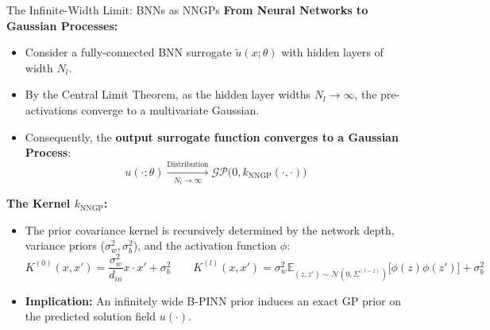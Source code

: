 \documentclass[10pt, aspectratio=169]{beamer}
\begin{document}
\begin{frame}{The Infinite-Width Limit: BNNs as NNGPs}
    \textbf{From Neural Networks to Gaussian Processes:}
    \begin{itemize}
        \item Consider a fully-connected BNN surrogate $\tilde{u}(x; \theta)$ with hidden layers of width $N_l$.
        \item By the Central Limit Theorem, as the hidden layer widths $N_l \to \infty$, the pre-activations converge to a multivariate Gaussian. 
        \item Consequently, the \textbf{output surrogate function converges to a Gaussian Process}:
        \[
        u(\cdot;\theta) \xrightarrow[N_l \to \infty]{\text{Distribution}} \mathcal{GP}\big(0, k_{\text{NNGP}}(\cdot, \cdot)\big)
        \]
    \end{itemize}
    \vspace{0.2cm}
    \textbf{The Kernel $k_{\text{NNGP}}$:}
    \begin{itemize}
        \item The prior covariance kernel is recursively determined by the network depth, variance priors ($\sigma_w^2, \sigma_b^2$), and the activation function $\phi$:
        \[
        K^{(0)}(x, x') = \frac{\sigma_w^2}{d_{in}} x \cdot x' + \sigma_b^2 \quad \quad K^{(l)}(x, x') = \sigma_w^2 \mathbb{E}_{(z, z') \sim \mathcal{N}(0, \Sigma^{(l-1)})} \Big[ \phi(z) \phi(z') \Big] + \sigma_b^2
        \]
        \item \textbf{Implication:} An infinitely wide B-PINN prior induces an exact GP prior on the predicted solution field $u(\cdot)$.
    \end{itemize}
\end{frame}
\end{document}

